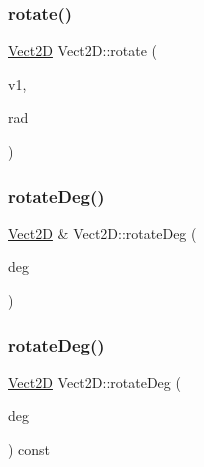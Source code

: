\subsubsection{\texorpdfstring{rotate()}{rotate()}\hspace{0.1cm}{\footnotesize\ttfamily [3/3]}}
{\footnotesize\ttfamily \hyperlink{classVect2D}{Vect2D} Vect2\+D\+::rotate (\begin{DoxyParamCaption}\item[{const \hyperlink{classVect2D}{Vect2D} \&}]{v1,  }\item[{double}]{rad }\end{DoxyParamCaption})\hspace{0.3cm}{\ttfamily [static]}}

\mbox{\label{classVect2D_af5b0305051ba2c3f97cfb2d49035ba97_af5b0305051ba2c3f97cfb2d49035ba97}} 
\subsubsection{\texorpdfstring{rotate\+Deg()}{rotateDeg()}\hspace{0.1cm}{\footnotesize\ttfamily [1/3]}}
{\footnotesize\ttfamily \hyperlink{classVect2D}{Vect2D} \& Vect2\+D\+::rotate\+Deg (\begin{DoxyParamCaption}\item[{double}]{deg }\end{DoxyParamCaption})}

\mbox{\label{classVect2D_ab02782179e127d49dc292504b498b6b6_ab02782179e127d49dc292504b498b6b6}} 
\subsubsection{\texorpdfstring{rotate\+Deg()}{rotateDeg()}\hspace{0.1cm}{\footnotesize\ttfamily [2/3]}}
{\footnotesize\ttfamily \hyperlink{classVect2D}{Vect2D} Vect2\+D\+::rotate\+Deg (\begin{DoxyParamCaption}\item[{double}]{deg }\end{DoxyParamCaption}) const}

\mbox{\label{classVect2D_a9b5ef5a8c654231b3c481f715d4210d5_a9b5ef5a8c654231b3c481f715d4210d5}} 
